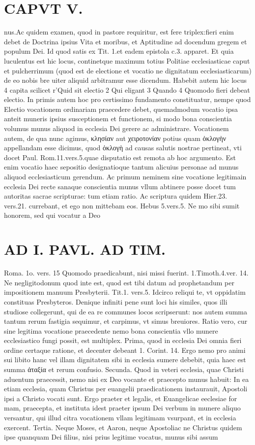 \documentclass{article}
\begin{document}
\begin{pages}
\section*{CAPVT  V. }
\marginpar{[ p.241 ]}\pstart nus.Ac quidem examen, quod in pastore requiritur, est fere triplex:fieri enim debet de Doctrina ipsius Vita et moribus, et Aptitudine ad docendum gregem et populum Dei. Id quod satis ex Tit. 1.et eadem epistola c.3. apparet. Et quia luculentus est hic locus, continetque maximum totius Politiae ecclesiasticae caput et pulcherrimum (quod est de electione et vocatio ne dignitatum ecclesiasticarum) de eo nobis bre uiter aliquid arbitramur esse dicendum. Habebit autem hic locus 4 capita scilicet r'Quid sit electio 2 Qui eligant 3 Quando 4 Quomodo fieri debeat electio. In primis autem hoc pro certissimo fundamento constituatur, nempe quod Electio vocationem ordinariam praecedere debet, quemadmodum vocatio ipsa anteit muneris ipsius susceptionem et functionem, si modo bona conscientia volumus munus aliquod in ecclesia Dei gerere ac administrare. Vocationem autem, de qua nunc agimus, κλησίαν aut χειροτονίαν potius quam ὀκλογὴν appellandam esse dicimus, quod ὀκλογὴ ad causas salutis nostrae pertineat, vti docet Paul. Rom.11.vers.5.quae disputatio est remota ab hoc argumento. Est enim vocatio haec sepositio designatioque tantum alicuius personae ad munus aliquod ecclesiasticum gerendum. Ac primum neminem sine vocatione legitimain ecclesia Dei recte sanaque conscientia munus vllum abtinere posse docet tum autoritas sacrae scripturae: tum etiam ratio. Ac scriptura quidem Hier.23. vers.21. currebant, et ego non mittebam eos. Hebus 5.vers.5. Ne mo sibi sumit honorem, sed qui vocatur a Deo\pend
\section*{AD I. PAVL. AD TIM. }
\marginpar{[ p.46 ]}\pstart Roma. 1o. vers. 15 Quomodo praedicabunt, nisi missi fuerint. 1.Timoth.4.ver. 14. Ne negligitodonum quod inte est, quod est tibi datum ad prophetandum per impositionem manuum Presbyterii. Tit.1. vers.5. Idcirco reliqui te, vt oppidatim constituas Presbyteros. Denique infiniti pene sunt loci his similes, quos illi studiose collegerunt, qui de ea re communes locos scripserunt: nos autem summa tantum rerum fastigia sequimur, et carpimus, vt simus breuiores. Ratio vero, cur sine legitima vocatione praecedente nemo bona conscientia vllo munere ecclesiastico fungi possit, est multiplex. Prima, quod in ecclesia Dei omnia fieri ordine certaque ratione, et decenter debeant 1. Corint. 14. Ergo nemo pro animi sui libito hanc vel illam dignitatem sibi in ecclesia sumere debebit, quia haec est summa ἀταξία et rerum confusio. Secunda. Quod in veteri ecclesia, quae Christi aduentum praecessit, nemo nisi ex Deo vocante et praecepto munus habuit: In ea etiam ecclesia, quam Christus per euangelii praedicationem instaurauit, Apostoli ipsi a Christo vocati sunt. Ergo praeter et legalis, et Euangelicae eeclesiae for mam, praecepta, et instituta idest praeter ipsum Dei verbum in munere aliquo versantur, qui illud citra vocationem vllam legitimam vsurpant, et in ecclesia exercent. Tertia. Neque Moses, et Aaron, neque Apostoliac ne Christus quidem ipse quanquam Dei filius, nisi prius legitime vocatus, munus sibi assum\pend

\end{pages}
\end{document}
